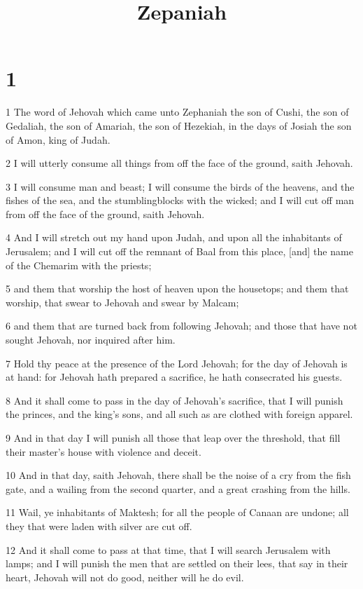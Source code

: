 

\title{Zepaniah}

\chapter{1}

\par 1 The word of Jehovah which came unto Zephaniah the son of Cushi, the son of Gedaliah, the son of Amariah, the son of Hezekiah, in the days of Josiah the son of Amon, king of Judah.
\par 2 I will utterly consume all things from off the face of the ground, saith Jehovah.
\par 3 I will consume man and beast; I will consume the birds of the heavens, and the fishes of the sea, and the stumblingblocks with the wicked; and I will cut off man from off the face of the ground, saith Jehovah.
\par 4 And I will stretch out my hand upon Judah, and upon all the inhabitants of Jerusalem; and I will cut off the remnant of Baal from this place, [and] the name of the Chemarim with the priests;
\par 5 and them that worship the host of heaven upon the housetops; and them that worship, that swear to Jehovah and swear by Malcam;
\par 6 and them that are turned back from following Jehovah; and those that have not sought Jehovah, nor inquired after him.
\par 7 Hold thy peace at the presence of the Lord Jehovah; for the day of Jehovah is at hand: for Jehovah hath prepared a sacrifice, he hath consecrated his guests.
\par 8 And it shall come to pass in the day of Jehovah's sacrifice, that I will punish the princes, and the king's sons, and all such as are clothed with foreign apparel.
\par 9 And in that day I will punish all those that leap over the threshold, that fill their master's house with violence and deceit.
\par 10 And in that day, saith Jehovah, there shall be the noise of a cry from the fish gate, and a wailing from the second quarter, and a great crashing from the hills.
\par 11 Wail, ye inhabitants of Maktesh; for all the people of Canaan are undone; all they that were laden with silver are cut off.
\par 12 And it shall come to pass at that time, that I will search Jerusalem with lamps; and I will punish the men that are settled on their lees, that say in their heart, Jehovah will not do good, neither will he do evil.

